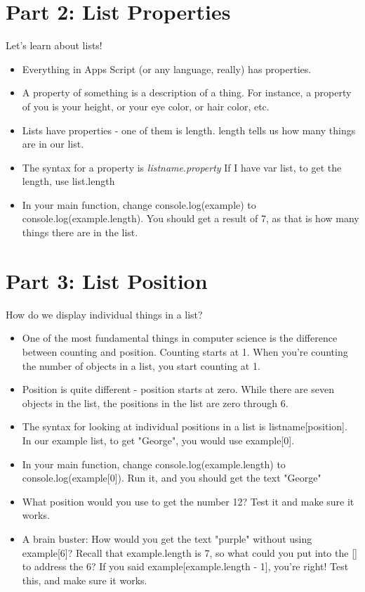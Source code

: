 \documentclass{article}
\begin{document}
\section*{Part 2: List Properties}
Let's learn about lists!
\begin{itemize}
    \item Everything in Apps Script (or any language, really) has properties.  
    \item A property of something is a description of a thing.  For instance, a property of you is your height, or your eye color, or hair color, etc.
    \item Lists have properties - one of them is length.  length tells us how many things are in our list.
    \item The syntax for a property is \textit{listname}.\textit{property} If I have var list, to get the length, use list.length
    \item In your main function, change console.log(example) to console.log(example.length).  You should get a result of 7, as that is how many things there are in the list. 
\end{itemize}

\section*{Part 3: List Position}
How do we display individual things in a list?  
\begin{itemize}
    \item One of the most fundamental things in computer science is the difference between counting and position.  Counting starts at 1.  When you're counting the number of objects in a list, you start counting at 1.
    \item Position is quite different - position starts at zero.  While there are seven objects in the list, the positions in the list are zero through 6.
    \item The syntax for looking at individual positions in a list is listname[position].  In our example list, to get "George", you would use example[0].  
    \item In your main function, change console.log(example.length) to console.log(example[0]).  Run it, and you should get the text "George"
    \item What position would you use to get the number 12? Test it and make sure it works. 
    \item A brain buster:  How would you get the text "purple" without using example[6]?  Recall that example.length is 7, so what could you put into the [] to address the 6?  If you said example[example.length - 1], you're right!  Test this, and make sure it works.
\end{itemize}
\end{document}
